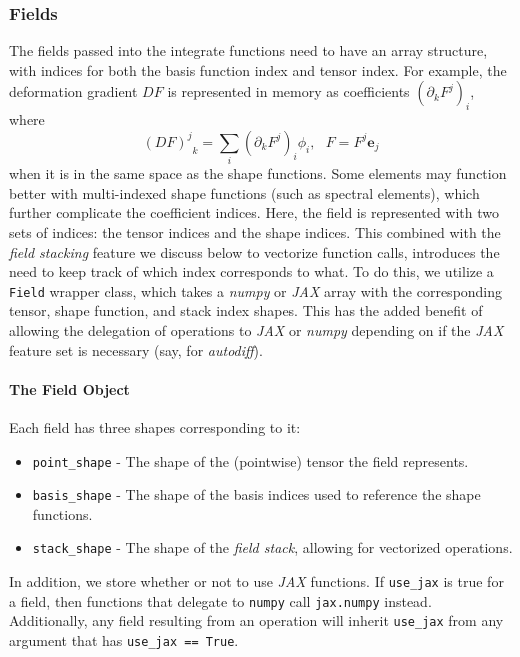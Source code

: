 \subsubsection{Fields} \label{sec:elem_field:fields}

The fields passed into the integrate functions need to have an array structure, with indices for both the basis function index and tensor index. For example, the deformation gradient $DF$ is represented in memory as coefficients $\left(\partial_k F^j\right)_i$, where
\begin{equation}
{(DF)^j}_{k} = \sum_i\left(\partial_k F^j\right)_i\phi_i,~~~F=F^j\mathbf{e}_j
\label{eqn:def_grad_discrete}
\end{equation}
when it is in the same space as the shape functions. Some elements may function better with multi-indexed shape functions (such as spectral elements), which further complicate the coefficient indices. Here, the field is represented with two sets of indices: the tensor indices and the shape indices. This combined with the \emph{field stacking} feature we discuss below to vectorize function calls, introduces the need to keep track of which index corresponds to what.
To do this, we utilize a \verb+Field+ wrapper class, which takes a \emph{numpy} or \emph{JAX} array with the corresponding tensor, shape function, and stack index shapes. This has the added benefit of allowing the delegation of operations to \emph{JAX} or \emph{numpy} depending on if the \emph{JAX} feature set is necessary (say, for \emph{autodiff}).

\paragraph{The Field Object}

Each field has three shapes corresponding to it:
\begin{itemize}
\item \verb+point_shape+ - The shape of the (pointwise) tensor the field represents.
\item \verb+basis_shape+ - The shape of the basis indices used to reference the shape functions.
\item \verb+stack_shape+ - The shape of the \emph{field stack}, allowing for vectorized operations.
\end{itemize}

In addition, we store whether or not to use \emph{JAX} functions. If \verb+use_jax+ is true for a field, then functions that delegate to \verb+numpy+ call \verb+jax.numpy+ instead. Additionally, any field resulting from an operation will inherit \verb+use_jax+ from any argument that has \verb+use_jax == True+.


